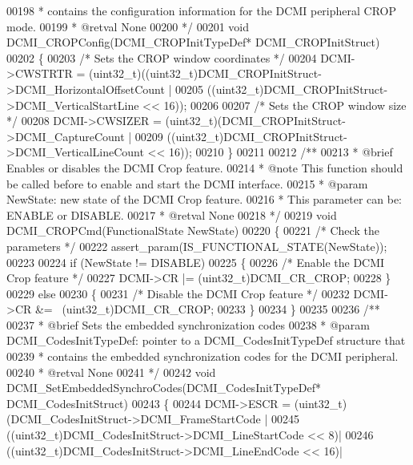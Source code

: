 \begin{DoxyCode}
00198 \textcolor{comment}{  *         contains the configuration information for the DCMI peripheral CROP mode.}
00199 \textcolor{comment}{  * @retval None}
00200 \textcolor{comment}{  */}
00201 \textcolor{keywordtype}{void} DCMI_CROPConfig(DCMI\_CROPInitTypeDef* DCMI\_CROPInitStruct)
00202 \{
00203   \textcolor{comment}{/* Sets the CROP window coordinates */}
00204   DCMI->CWSTRTR = (uint32\_t)((uint32\_t)DCMI\_CROPInitStruct->DCMI\_HorizontalOffsetCount |
00205                   ((uint32\_t)DCMI\_CROPInitStruct->DCMI\_VerticalStartLine << 16));
00206 
00207   \textcolor{comment}{/* Sets the CROP window size */}
00208   DCMI->CWSIZER = (uint32\_t)(DCMI\_CROPInitStruct->DCMI\_CaptureCount |
00209                   ((uint32\_t)DCMI\_CROPInitStruct->DCMI\_VerticalLineCount << 16));
00210 \}
00211 
00212 \textcolor{comment}{/**}
00213 \textcolor{comment}{  * @brief  Enables or disables the DCMI Crop feature.}
00214 \textcolor{comment}{  * @note   This function should be called before to enable and start the DCMI interface.}
00215 \textcolor{comment}{  * @param  NewState: new state of the DCMI Crop feature. }
00216 \textcolor{comment}{  *          This parameter can be: ENABLE or DISABLE.}
00217 \textcolor{comment}{  * @retval None}
00218 \textcolor{comment}{  */}
00219 \textcolor{keywordtype}{void} DCMI_CROPCmd(FunctionalState NewState)
00220 \{
00221   \textcolor{comment}{/* Check the parameters */}
00222   assert_param(IS\_FUNCTIONAL\_STATE(NewState));
00223 
00224   \textcolor{keywordflow}{if} (NewState != DISABLE)
00225   \{
00226     \textcolor{comment}{/* Enable the DCMI Crop feature */}
00227     DCMI->CR |= (uint32\_t)DCMI_CR_CROP;
00228   \}
00229   \textcolor{keywordflow}{else}
00230   \{
00231     \textcolor{comment}{/* Disable the DCMI Crop feature */}
00232     DCMI->CR &= ~(uint32\_t)DCMI_CR_CROP;
00233   \}
00234 \}
00235 
00236 \textcolor{comment}{/**}
00237 \textcolor{comment}{  * @brief  Sets the embedded synchronization codes}
00238 \textcolor{comment}{  * @param  DCMI\_CodesInitTypeDef: pointer to a DCMI\_CodesInitTypeDef structure that}
00239 \textcolor{comment}{  *         contains the embedded synchronization codes for the DCMI peripheral.}
00240 \textcolor{comment}{  * @retval None}
00241 \textcolor{comment}{  */}
00242 \textcolor{keywordtype}{void} DCMI_SetEmbeddedSynchroCodes(DCMI\_CodesInitTypeDef* DCMI\_CodesInitStruct)
00243 \{
00244   DCMI->ESCR = (uint32\_t)(DCMI\_CodesInitStruct->DCMI\_FrameStartCode |
00245                           ((uint32\_t)DCMI\_CodesInitStruct->DCMI\_LineStartCode << 8)|
00246                           ((uint32\_t)DCMI\_CodesInitStruct->DCMI\_LineEndCode << 16)|

\end{DoxyCode}
